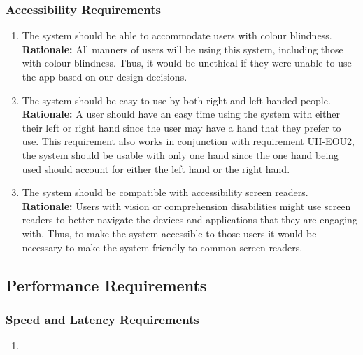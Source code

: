 \documentclass[]{article}
\begin{document}
\subsubsection{Accessibility Requirements}
\label{ssub:accessibility_requirements}
\begin{enumerate}[{UH-A}1. ]
	\item The system should be able to accommodate users with colour blindness.\\
	\textbf{Rationale:} All manners of users will be using this system, including those with colour blindness. Thus, it would be unethical if they were unable to use the app based on our design decisions.
	\item The system should be easy to use by both right and left handed people.\\
	\textbf{Rationale:} A user should have an easy time using the system with either their left or right hand since the user may have a hand that they prefer to use. This requirement also works in conjunction with requirement UH-EOU2, the system should be usable with only one hand since the one hand being used should account for either the left hand or the right hand.
	\item The system should be compatible with accessibility screen readers.\\
	\textbf{Rationale:} Users with vision or comprehension disabilities might use screen readers to better navigate the devices and applications that they are engaging with. Thus, to make the system accessible to those users it would be necessary to make the system friendly to common screen readers.
\end{enumerate}


\subsection{Performance Requirements}
\label{sub:performance_requirements}

\subsubsection{Speed and Latency Requirements}
\label{ssub:speed_and_latency_requirements}
\begin{enumerate}[label={PR-SL\arabic*.}]
    \item 
\end{enumerate}
\end{document}
